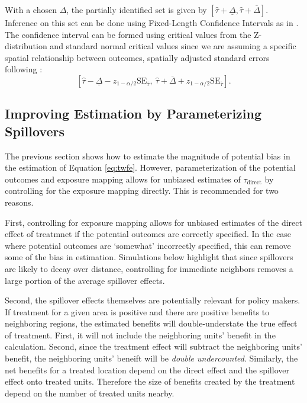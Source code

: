 \documentclass[11pt]{article}
\begin{document}
With a chosen $\Delta$, the partially identified set is given by $[\hat{\tau} + \underline{\Delta}, \hat{\tau} + \overline{\Delta}]$. Inference on this set can be done using Fixed-Length Confidence Intervals as in \citet{Rambachan_Roth_2020}. The confidence interval can be formed using critical values from the Z-distribution and  standard normal critical values since we are assuming a specific spatial relationship between outcomes, spatially adjusted standard errors following \citet{Conley_1999}: \[ 
    \left[ \hat{\tau} - \underline{\Delta} - z_{1 - \alpha/2} \text{SE}_{\hat{\tau}}, \ \hat{\tau} + \overline{\Delta} + z_{1 - \alpha/2} \text{SE}_{\hat{\tau}}\right].  
\]


\subsection{Improving Estimation by Parameterizing Spillovers}

The previous section shows how to estimate the magnitude of potential bias in the estimation of Equation \ref{eq:twfe}. However, parameterization of the potential outcomes and exposure mapping allows for unbiased estimates of $\tau_{\text{direct}}$ by controlling for the exposure mapping directly. This is recommended for two reasons. 

First, controlling for exposure mapping allows for unbiased estimates of the direct effect of treatmnet if the potential outcomes are correctly specified. In the case where potential outcomes are `somewhat' incorrectly specified, this can remove some of the bias in estimation. Simulations below highlight that since spillovers are likely to decay over distance, controlling for immediate neighbors removes a large portion of the average spillover effects.

Second, the spillover effects themselves are potentially relevant for policy makers. If treatment for a given area is positive and there are positive benefits to neighboring regions, the estimated benefits will double-understate the true effect of treatment. First, it will not include the neighboring units' benefit in the calculation. Second, since the treatment effect will subtract the neighboring units' benefit, the neighboring units' beneift will be \emph{double undercounted}. Similarly, the net benefits for a treated location depend on the direct effect and the spillover effect onto treated units. Therefore the size of benefits created by the treatment depend on the number of treated units nearby.
\end{document}
